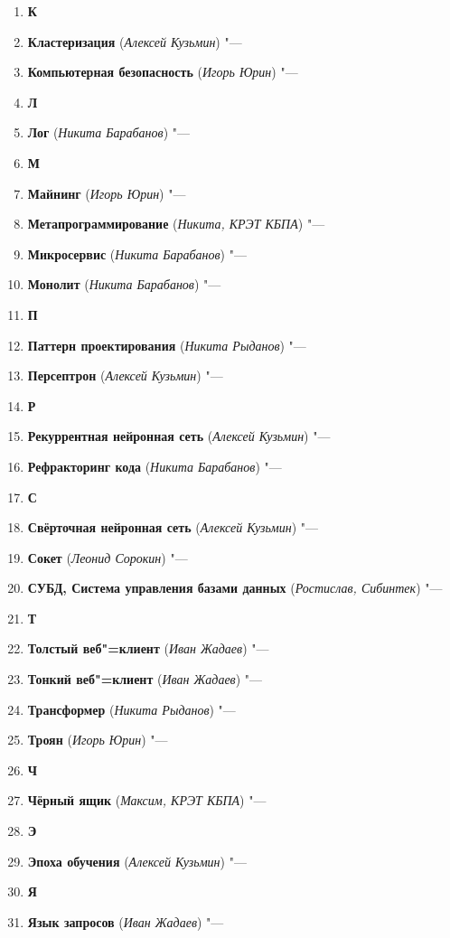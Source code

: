 \documentclass[a4paper, 14 pt]{extarticle}
\begin{document}
\begin{enumerate}
    \item[] \textbf{К}
    \item \textbf{Кластеризация} (\textit{Алексей Кузьмин}) "--- 
    \item \textbf{Компьютерная безопасность} (\textit{Игорь Юрин}) "--- 
    \item[] \textbf{Л}
    \item \textbf{Лог} (\textit{Никита Барабанов}) "--- 
    \item[] \textbf{М}
    \item \textbf{Майнинг} (\textit{Игорь Юрин}) "--- 
    \item \textbf{Метапрограммирование} (\textit{Никита, КРЭТ КБПА}) "--- 
    \item \textbf{Микросервис} (\textit{Никита Барабанов}) "--- 
    \item \textbf{Монолит} (\textit{Никита Барабанов}) "--- 
    \item[] \textbf{П}
    \item \textbf{Паттерн проектирования} (\textit{Никита Рыданов}) "--- 
    \item \textbf{Персептрон} (\textit{Алексей Кузьмин}) "--- 
    \item[] \textbf{Р}
    \item \textbf{Рекуррентная нейронная сеть} (\textit{Алексей Кузьмин}) "---
    \item \textbf{Рефракторинг кода} (\textit{Никита Барабанов}) "--- 
    \item[] \textbf{С}
    \item \textbf{Свёрточная нейронная сеть} (\textit{Алексей Кузьмин}) "--- 
    \item \textbf{Сокет} (\textit{Леонид Сорокин}) "--- 
    \item \textbf{СУБД, Система управления базами данных} 
    (\textit{Ростислав, Сибинтек}) "---  
    \item[] \textbf{Т}
    \item \textbf{Толстый веб"=клиент} (\textit{Иван Жадаев}) "--- 
    \item \textbf{Тонкий веб"=клиент} (\textit{Иван Жадаев}) "--- 
    \item \textbf{Трансформер} (\textit{Никита Рыданов}) "--- 
    \item \textbf{Троян} (\textit{Игорь Юрин}) "--- 
    \item[] \textbf{Ч}
    \item \textbf{Чёрный ящик} (\textit{Максим, КРЭТ КБПА}) "--- 
    \item[] \textbf{Э}
    \item \textbf{Эпоха обучения} (\textit{Алексей Кузьмин}) "--- 
    \item[] \textbf{Я}
    \item \textbf{Язык запросов} (\textit{Иван Жадаев}) "--- 

\end{enumerate}
\end{document}
